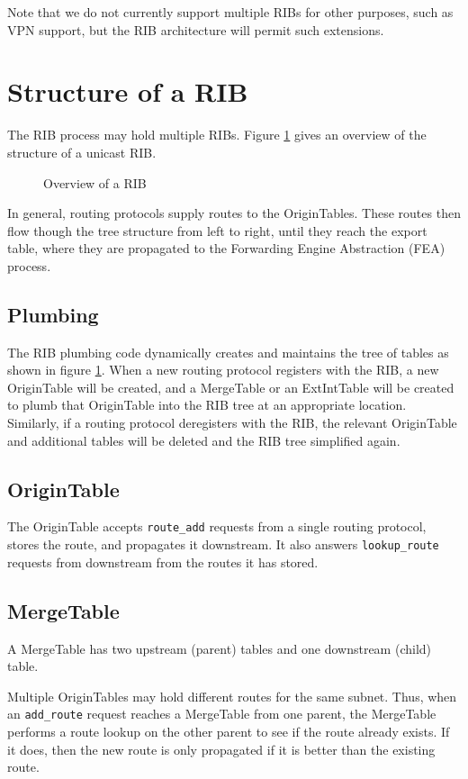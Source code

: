 \documentclass[11pt]{article}
\begin{document}
Note that we do not currently support multiple RIBs for other
purposes, such as VPN support, but the RIB architecture will permit
such extensions.
\section{Structure of a RIB}
The RIB process may hold multiple RIBs.  Figure \ref{overview} gives
an overview of the structure of a unicast RIB.
\begin{figure}[htb]
\centerline{}
\vspace{.05in}
\caption{\label{overview}Overview of a RIB}
\end{figure}
In general, routing protocols supply routes to the OriginTables.
These routes then flow though the tree structure from left to right,
until they reach the export table, where they are propagated to the
Forwarding Engine Abstraction (FEA) process.

\subsection{Plumbing}

The RIB plumbing code dynamically creates and maintains the tree of
tables as shown in figure \ref{overview}.  When a new routing protocol
registers with the RIB, a new OriginTable will be created, and a
MergeTable or an ExtIntTable will be created to plumb that OriginTable
into the RIB tree at an appropriate location.  Similarly, if a routing
protocol deregisters with the RIB, the relevant OriginTable and
additional tables will be deleted and the RIB tree simplified again.

\subsection{OriginTable}

The OriginTable accepts {\tt route\_add} requests from a single routing
protocol, stores the route, and propagates it downstream.  It also
answers {\tt lookup\_route} requests from downstream from the routes it
has stored.

\subsection{MergeTable}

A MergeTable has two upstream (parent) tables and one downstream
(child) table.

Multiple OriginTables may hold different routes for the same subnet.
Thus, when an {\tt add\_route} request reaches a MergeTable from one
parent, the MergeTable performs a route lookup on the other parent to
see if the route already exists.  If it does, then the new route is
only propagated if it is better than the existing route.
\end{document}
